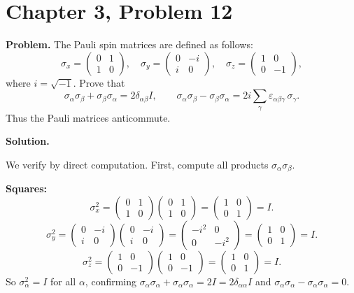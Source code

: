 \documentclass[12pt]{article}
\begin{document}
\section*{Chapter 3, Problem 12}

\textbf{Problem.} The Pauli spin matrices are defined as follows:
\[
\sigma_x = \begin{pmatrix} 0 & 1 \\ 1 & 0 \end{pmatrix}, \quad
\sigma_y = \begin{pmatrix} 0 & -i \\ i & 0 \end{pmatrix}, \quad
\sigma_z = \begin{pmatrix} 1 & 0 \\ 0 & -1 \end{pmatrix},
\]
where $i = \sqrt{-1}$. Prove that
\[
\sigma_\alpha \sigma_\beta + \sigma_\beta \sigma_\alpha = 2\delta_{\alpha\beta} I, \qquad
\sigma_\alpha \sigma_\beta - \sigma_\beta \sigma_\alpha = 2i \sum_\gamma \varepsilon_{\alpha\beta\gamma}\, \sigma_\gamma.
\]
Thus the Pauli matrices anticommute.

\bigskip
\textbf{Solution.}

We verify by direct computation. First, compute all products $\sigma_\alpha \sigma_\beta$.

\medskip
\textbf{Squares:}
\[
\sigma_x^2 = \begin{pmatrix} 0&1\\1&0 \end{pmatrix}\begin{pmatrix} 0&1\\1&0 \end{pmatrix} = \begin{pmatrix} 1&0\\0&1 \end{pmatrix} = I.
\]
\[
\sigma_y^2 = \begin{pmatrix} 0&-i\\i&0 \end{pmatrix}\begin{pmatrix} 0&-i\\i&0 \end{pmatrix} = \begin{pmatrix} -i^2 & 0 \\ 0 & -i^2 \end{pmatrix} = \begin{pmatrix} 1&0\\0&1 \end{pmatrix} = I.
\]
\[
\sigma_z^2 = \begin{pmatrix} 1&0\\0&-1 \end{pmatrix}\begin{pmatrix} 1&0\\0&-1 \end{pmatrix} = \begin{pmatrix} 1&0\\0&1 \end{pmatrix} = I.
\]
So $\sigma_\alpha^2 = I$ for all $\alpha$, confirming $\sigma_\alpha\sigma_\alpha + \sigma_\alpha\sigma_\alpha = 2I = 2\delta_{\alpha\alpha}I$ and $\sigma_\alpha\sigma_\alpha - \sigma_\alpha\sigma_\alpha = 0$.
\end{document}
